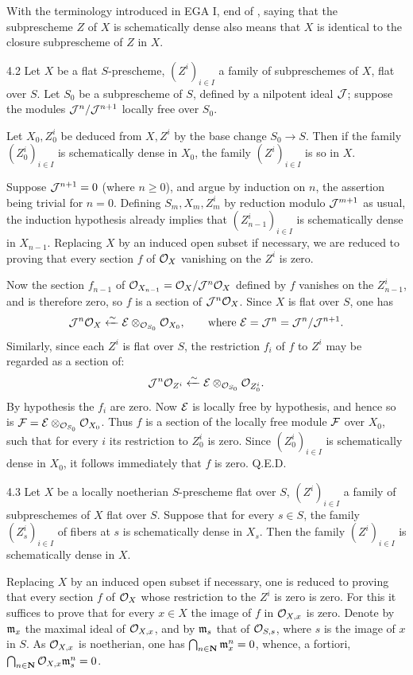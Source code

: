 With the terminology introduced in EGA I, end of , saying that the subprescheme $Z$ of $X$ is schematically dense also means that $X$ is identical to the closure subprescheme of $Z$ in $X$.
\begin{lemma}{4.2}\label{IX.4.2}
Let $X$ be a flat $S$-prescheme, $(Z^i)_{i\in I}$ a family of subpreschemes of $X$, flat over $S$. Let $S_0$ be a subprescheme of $S$, defined by a nilpotent ideal $\cal J$; suppose the modules $\cal J^n/\cal J^{n+1}$ locally free over $S_0$.

Let $X_0,Z^i_0$ be deduced from $X,Z^i$ by the base change $S_0\to S$. Then if the family $(Z^i_0)_{i\in I}$ is schematically dense in $X_0$, the family $(Z^i)_{i\in I}$ is so in $X$.
\end{lemma}
Suppose $\cal J^{n+1}=0$ (where $n\geq0$), and argue by induction on $n$, the assertion being trivial for $n=0$. Defining $S_m,X_m,Z^i_m$ by reduction modulo $\cal J^{m+1}$ as usual, the induction hypothesis already implies that $(Z^i_{n-1})_{i\in I}$ is schematically dense in $X_{n-1}$. Replacing $X$ by an induced open subset if necessary, we are reduced to proving that every section $f$ of $\OX$ vanishing on the $Z^i$ is zero.

Now the section $f_{n-1}$ of $\OO_{X_{n-1}}=\OX/\cal J^n\OX$ defined by $f$ vanishes on the $Z^i_{n-1}$, and is therefore zero, so $f$ is a section of $\cal J^n\OX$. Since $X$ is flat over $S$, one has
\[
\cal J^n\OX\isomfrom\cal E\otimes_{\OO_{S_0}}\OO_{X_0},\qquad\text{where }\cal E=\cal J^n=\cal J^n/\cal J^{n+1}.
\]
Similarly, since each $Z^i$ is flat over $S$, the restriction $f_i$ of $f$ to $Z^i$ may be regarded as a section of:
\[
\cal J^n\OO_{Z^i}\isomfrom\cal E\otimes_{\OO_{S_0}}\OO_{Z^i_0}.
\]
By hypothesis the $f_i$ are zero. Now $\cal E$ is locally free by hypothesis, and hence so is $\cal F=\cal E\otimes_{\OO_{S_0}}\OO_{X_0}$. Thus $f$ is a section of the locally free module $\cal F$ over $X_0$, such that for every $i$ its restriction to $Z^i_0$ is zero. Since $(Z^i_0)_{i\in I}$ is schematically dense in $X_0$, it follows immediately that $f$ is zero. \hfill Q.E.D.
\begin{corollary}{4.3}\label{IX.4.3}
Let $X$ be a locally noetherian $S$-prescheme flat over $S$, $(Z^i)_{i\in I}$ a family of subpreschemes of $X$ flat over $S$. Suppose that for every $s\in S$, the family $(Z^i_s)_{i\in I}$ of fibers at $s$ is schematically dense in $X_s$. Then the family $(Z^i)_{i\in I}$ is schematically dense in $X$.
\end{corollary}
Replacing $X$ by an induced open subset if necessary, one is reduced to proving that every section $f$ of $\OX$ whose restriction to the $Z^i$ is zero is zero. For this it suffices to prove that for every $x\in X$ the image of $f$ in $\OO_{X,x}$ is zero. Denote by $\goth m_x$ the maximal ideal of $\OO_{X,x}$, and by $\goth m_s$ that of $\OO_{S,s}$, where $s$ is the image of $x$ in $S$. As $\OO_{X,x}$ is noetherian, one has $\bigcap_{n\in\NN}\goth m_x^n=0$, whence, a fortiori, $\bigcap_{n\in\NN}\OO_{X,x}\goth m_s^n=0$.

